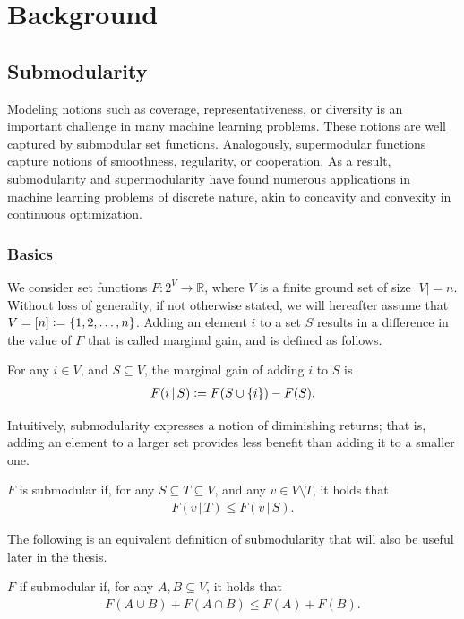 \chapter{Background} \label{ch:background}

\section{Submodularity} \label{sect:bg_submod}

Modeling notions such as coverage, representativeness, or diversity is an important challenge in many machine learning problems.
These notions are well captured by submodular set functions.
Analogously, supermodular functions capture notions of smoothness, regularity, or cooperation. 
As a result, submodularity and supermodularity have found numerous applications in machine learning problems of discrete nature, akin to concavity and convexity in continuous optimization.

\subsection{Basics}
We consider set functions $F : 2^V \to \mathbb{R}$, where $V$ is a finite ground set of size $|V| = n$.
Without loss of generality, if not otherwise stated, we will hereafter assume that $V = [n] \vcentcolon= \{1, 2, \ldots,n\}$.
Adding an element $i$ to a set $S$ results in a difference in the value of $F$ that is called marginal gain, and is defined as follows.
\begin{definition}
For any $i \in V$, and $S \subseteq V$, the marginal gain of adding $i$ to $S$ is
\begin{align*}
F(i \,|\, S) \vcentcolon= F(S \cup \{i\}) - F(S).
\end{align*}
\end{definition}

Intuitively, submodularity expresses a notion of diminishing returns; that is, adding an element to a larger set provides less benefit than adding it to a smaller one.
\begin{definition}[Submodularity]
$F$ is submodular if, for any $S \subseteq T \subseteq V$, and any $v \in V \setminus T$, it holds that
\begin{align*}
F(v\,|\, T) \leq F(v\,|\, S).
\end{align*}
\end{definition}
\noindent The following is an equivalent definition of submodularity that will also be useful later in the thesis.
\begin{definition}[Submodularity] \label{def:submod}
$F$ if submodular if, for any $A, B \subseteq V$, it holds that
\begin{align*}
F(A \cup B) + F(A \cap B) \leq F(A) + F(B).
\end{align*}
\end{definition}

